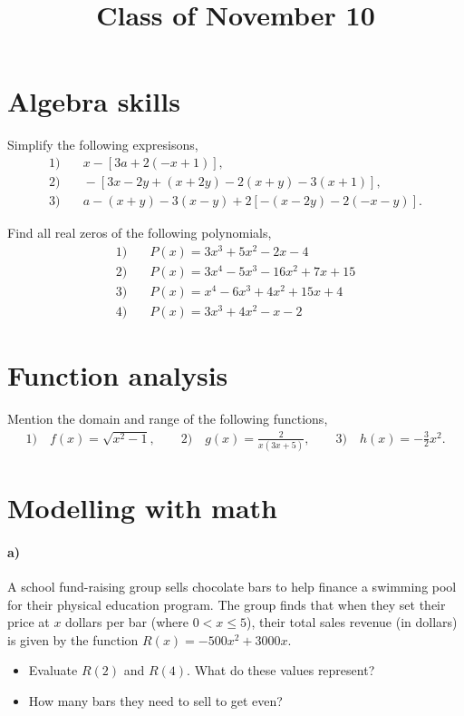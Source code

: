 \documentclass{tareaClass}
\title{Class of November 10 }
\begin{document}

\maketitle

\section{Algebra skills}

Simplify the following expresisons,
\begin{align*}
    1) &\quad x-\left[ 3a + 2(-x+1)\right], \\
    2) &\quad -\left[3x-2y+(x+2y)-2(x+y)-3(x+1)\right], \\
    3) &\quad a-(x+y) -3(x-y) +2\left[-(x-2y)-2(-x-y)\right].
\end{align*}

Find all real zeros of the following polynomials,
\begin{align*}
    1) &\quad P(x) = 3x^3 + 5x^2 -2x - 4 \\
    2) &\quad P(x) = 3x^4 -5x^3 -16x^2 +7x + 15 \\
    3) &\quad P(x) = x^4 -6x^3 + 4x^2 +15 x + 4 \\
    4) &\quad P(x) = 3x^3 + 4x^2 -x -2 
\end{align*}

\section{Function analysis}

Mention the domain and range of the following functions,
\begin{align*}
    1) \quad f(x) = \sqrt{x^2 -1}, \qquad 
    2) \quad g(x) = \frac{2}{x(3x+5)}, \qquad
    3) \quad h(x) = -\frac{3}{2}x^2.
\end{align*}

\section{Modelling with math}

\paragraph{a)} A school fund-raising group sells chocolate bars to help ﬁnance a swimming pool for their physical education program. 
The group ﬁnds that when they set their price at $x$ dollars per bar (where $0<x\leq5$), their total sales revenue (in dollars) is given by the function $R(x) = -500x^2 + 3000x$.
\begin{itemize}
    \item Evaluate $R(2)$ and $R(4)$. What do these values represent?
    \item How many bars they need to sell to get even?
\end{itemize}
\end{document}
